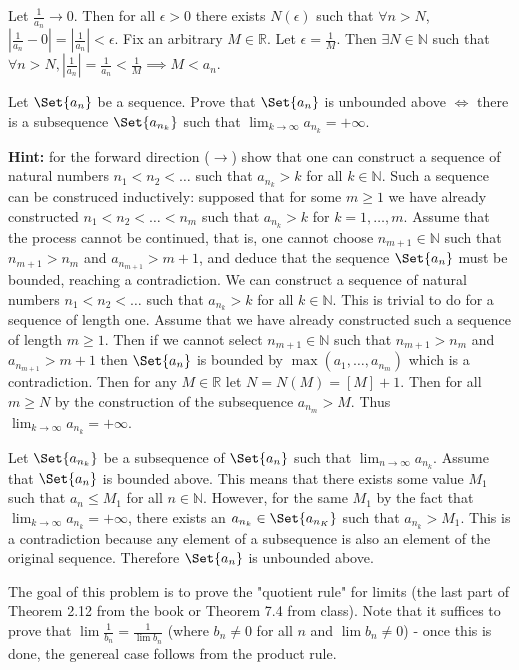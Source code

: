 \documentclass[paper=a4, fontsize=11pt]{jhwhw} %
\begin{document}
Let $\frac{1}{a_n}\to 0$. Then for all $\epsilon > 0$ there exists $N(\epsilon)$ such that $\forall n > N$, $\left|\frac{1}{a_n} - 0\right| = \left|\frac{1}{a_n}\right| < \epsilon $. Fix an arbitrary $M\in \mathbb R$. Let $\epsilon = \frac{1}{M}$. Then $\exists N\in \mathbb N$ such that $\forall n > N, \left|\frac{1}{a_n}\right| = \frac{1}{a_n} < \frac{1}{M} \implies M < a_n$. 

Let $\Set{a_n}$ be a sequence. Prove that $\Set{a_n}$ is unbounded above $\iff$ there is a subsequence $\Set{a_{n_k}}$ such that $\lim_{k\to\infty}a_{n_k} = +\infty$. 

    \textbf{Hint:} for the forward direction ($\to$) show that one can construct a sequence of natural numbers $n_1 < n_2 < \ldots$ such that $a_{n_k} > k$ for all $k\in \mathbb N$. Such a sequence can be construced inductively: supposed that for some $m \ge 1$ we have already constructed $n_1 < n_2 < \ldots < n_m$ such that $a_{n_k} > k$ for $k = 1,\ldots, m$. Assume that the process cannot be continued, that is, one cannot choose $n_{m+1}\in \mathbb N$ such that $n_{m+1} > n_m$ and $a_{n_{m+1}} > m + 1$, and deduce that the sequence $\Set{a_n}$ must be bounded, reaching a contradiction.
\solution
We can construct a sequence of natural numbers $n_1 < n_2 < \ldots$ such that $a_{n_k} > k$ for all $k\in \mathbb N$. This is trivial to do for a sequence of length one. Assume that we have already constructed such a sequence of length $m\ge 1$. Then if we cannot select $n_{m+1} \in \mathbb N$ such that $n_{m+1} > n_m$ and $a_{n_{m+1}} > m + 1$ then $\Set{a_n}$ is bounded by $\max(a_1, \ldots, a_{n_m})$ which is a contradiction. Then for any $M\in \mathbb R$ let $N = N(M) = [M] + 1$. Then for all $m \ge N$ by the construction of the subsequence $a_{n_m} > M$. Thus $\lim_{k\to\infty}a_{n_k} = +\infty$.

Let $\Set{a_{n_k}}$ be a subsequence of $\Set{a_n}$ such that $\lim_{n\to\infty}a_{n_k}$. Assume that $\Set{a_n}$ is bounded above. This means that there exists some value $M_1$ such that $a_n \le M_1$ for all $n\in \mathbb N$. However, for the same $M_1$ by the fact that $\lim_{k\to\infty}a_{n_k} = +\infty$, there exists an $a_{n_k} \in \Set{a_{n_K}}$ such that $a_{n_k} > M_1$. This is a contradiction because any element of a subsequence is also an element of the original sequence. Therefore $\Set{a_n}$ is unbounded above.

The goal of this problem is to prove the "quotient rule" for limits (the last part of Theorem 2.12 from the book or Theorem 7.4 from class). Note that it suffices to prove that $\lim\frac{1}{b_n} = \frac{1}{\lim b_n}$ (where $b_n \not= 0$ for all $n$ and $\lim b_n \not= 0$) - once this is done, the genereal case follows from the product rule. 
\end{document}
